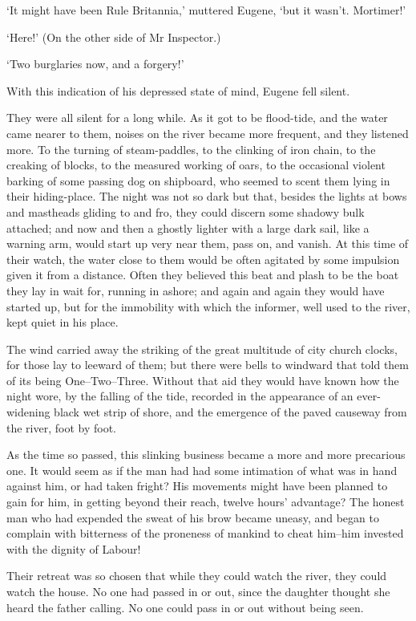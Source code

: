 ‘It might have been Rule Britannia,’ muttered Eugene, ‘but it wasn’t.
Mortimer!’

‘Here!’ (On the other side of Mr Inspector.)

‘Two burglaries now, and a forgery!’

With this indication of his depressed state of mind, Eugene fell silent.

They were all silent for a long while. As it got to be flood-tide, and
the water came nearer to them, noises on the river became more frequent,
and they listened more. To the turning of steam-paddles, to the clinking
of iron chain, to the creaking of blocks, to the measured working
of oars, to the occasional violent barking of some passing dog on
shipboard, who seemed to scent them lying in their hiding-place. The
night was not so dark but that, besides the lights at bows and mastheads
gliding to and fro, they could discern some shadowy bulk attached; and
now and then a ghostly lighter with a large dark sail, like a warning
arm, would start up very near them, pass on, and vanish. At this time
of their watch, the water close to them would be often agitated by some
impulsion given it from a distance. Often they believed this beat and
plash to be the boat they lay in wait for, running in ashore; and again
and again they would have started up, but for the immobility with which
the informer, well used to the river, kept quiet in his place.

The wind carried away the striking of the great multitude of city
church clocks, for those lay to leeward of them; but there were bells to
windward that told them of its being One--Two--Three. Without that aid
they would have known how the night wore, by the falling of the tide,
recorded in the appearance of an ever-widening black wet strip of shore,
and the emergence of the paved causeway from the river, foot by foot.

As the time so passed, this slinking business became a more and more
precarious one. It would seem as if the man had had some intimation of
what was in hand against him, or had taken fright? His movements might
have been planned to gain for him, in getting beyond their reach, twelve
hours’ advantage? The honest man who had expended the sweat of his brow
became uneasy, and began to complain with bitterness of the proneness of
mankind to cheat him--him invested with the dignity of Labour!

Their retreat was so chosen that while they could watch the river, they
could watch the house. No one had passed in or out, since the daughter
thought she heard the father calling. No one could pass in or out
without being seen.


